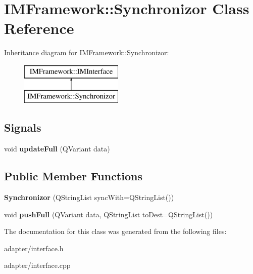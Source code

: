 \hypertarget{classIMFramework_1_1Synchronizor}{
\section{IMFramework::Synchronizor Class Reference}
\label{classIMFramework_1_1Synchronizor}
}
Inheritance diagram for IMFramework::Synchronizor:\begin{figure}[H]
\begin{center}
\leavevmode
\includegraphics[height=2cm]{classIMFramework_1_1Synchronizor}
\end{center}
\end{figure}
\subsection*{Signals}
\begin{DoxyCompactItemize}
\item 
\hypertarget{classIMFramework_1_1Synchronizor_a1c3990c174267237d7c19bd7cffcc50f}{
void {\bfseries updateFull} (QVariant data)}
\label{classIMFramework_1_1Synchronizor_a1c3990c174267237d7c19bd7cffcc50f}

\end{DoxyCompactItemize}
\subsection*{Public Member Functions}
\begin{DoxyCompactItemize}
\item 
\hypertarget{classIMFramework_1_1Synchronizor_a126cbe0569ad3450ff76d689e0e54740}{
{\bfseries Synchronizor} (QStringList syncWith=QStringList())}
\label{classIMFramework_1_1Synchronizor_a126cbe0569ad3450ff76d689e0e54740}

\item 
\hypertarget{classIMFramework_1_1Synchronizor_a0dc8019a8ea761e238dfc9253e77a667}{
void {\bfseries pushFull} (QVariant data, QStringList toDest=QStringList())}
\label{classIMFramework_1_1Synchronizor_a0dc8019a8ea761e238dfc9253e77a667}

\end{DoxyCompactItemize}


The documentation for this class was generated from the following files:\begin{DoxyCompactItemize}
\item 
adapter/interface.h\item 
adapter/interface.cpp\end{DoxyCompactItemize}

